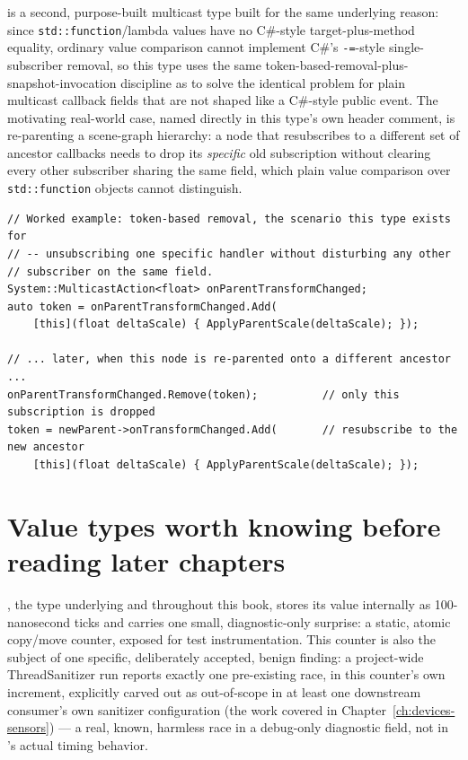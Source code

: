  is a second, purpose-built multicast type built
for the same underlying reason: since \texttt{std::function}/lambda values have no C\#-style
target-plus-method equality, ordinary value comparison cannot implement C\#'s
\texttt{-=}-style single-subscriber removal, so this type uses the same
token-based-removal-plus-snapshot-invocation discipline as  to solve
the identical problem for plain multicast callback fields that are not shaped like a
C\#-style public event. The motivating real-world case, named directly in this type's own
header comment, is re-parenting a scene-graph hierarchy: a node that resubscribes to a
different set of ancestor callbacks needs to drop its \emph{specific} old subscription without
clearing every other subscriber sharing the same field, which plain value comparison over
\texttt{std::function} objects cannot distinguish.

\begin{lstlisting}
// Worked example: token-based removal, the scenario this type exists for
// -- unsubscribing one specific handler without disturbing any other
// subscriber on the same field.
System::MulticastAction<float> onParentTransformChanged;
auto token = onParentTransformChanged.Add(
    [this](float deltaScale) { ApplyParentScale(deltaScale); });

// ... later, when this node is re-parented onto a different ancestor ...
onParentTransformChanged.Remove(token);          // only this subscription is dropped
token = newParent->onTransformChanged.Add(       // resubscribe to the new ancestor
    [this](float deltaScale) { ApplyParentScale(deltaScale); });
\end{lstlisting}

\section{Value types worth knowing before reading later chapters}

, the type underlying  and
 throughout this book, stores its value internally
as 100-nanosecond ticks and carries one small, diagnostic-only surprise: a static, atomic
copy/move counter, exposed for test instrumentation. This counter is also the subject of one
specific, deliberately accepted, benign finding: a project-wide ThreadSanitizer run reports
exactly one pre-existing race, in this counter's own increment, explicitly carved out as
out-of-scope in at least one downstream consumer's own sanitizer configuration (the
 work covered in Chapter~\ref{ch:devices-sensors}) --- a real,
known, harmless race in a debug-only diagnostic field, not in 's actual
timing behavior.

